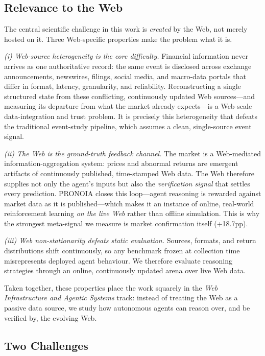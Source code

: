 \documentclass[sigconf, anonymous, review]{acmart}
\begin{document}
\subsection{Relevance to the Web}

The central scientific challenge in this work is \emph{created} by the Web, not merely hosted on it. Three Web-specific properties make the problem what it is.

\emph{(i) Web-source heterogeneity is the core difficulty.} Financial information never arrives as one authoritative record: the same event is disclosed across exchange announcements, newswires, filings, social media, and macro-data portals that differ in format, latency, granularity, and reliability. Reconstructing a single structured state from these conflicting, continuously updated Web sources---and measuring its departure from what the market already expects---is a Web-scale data-integration and trust problem. It is precisely this heterogeneity that defeats the traditional event-study pipeline, which assumes a clean, single-source event signal.

\emph{(ii) The Web is the ground-truth feedback channel.} The market is a Web-mediated information-aggregation system: prices and abnormal returns are emergent artifacts of continuously published, time-stamped Web data. The Web therefore supplies not only the agent's inputs but also the \emph{verification signal} that settles every prediction. PRONOIA closes this loop---agent reasoning is rewarded against market data as it is published---which makes it an instance of online, real-world reinforcement learning \emph{on the live Web} rather than offline simulation. This is why the strongest meta-signal we measure is market confirmation itself (+18.7pp).

\emph{(iii) Web non-stationarity defeats static evaluation.} Sources, formats, and return distributions shift continuously, so any benchmark frozen at collection time misrepresents deployed agent behaviour. We therefore evaluate reasoning strategies through an online, continuously updated arena over live Web data.

Taken together, these properties place the work squarely in the \emph{Web Infrastructure and Agentic Systems} track: instead of treating the Web as a passive data source, we study how autonomous agents can reason over, and be verified by, the evolving Web.

\subsection{Two Challenges}
\end{document}
